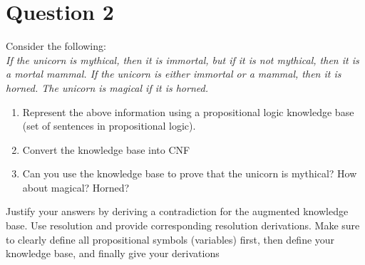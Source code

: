 \documentclass[13pt]{article}
\begin{document}
\newpage
\section*{Question 2} Consider the following: \\
\textit{If the unicorn is mythical, then it is immortal, but if it is not mythical, then it is a mortal
  mammal. If the unicorn is either immortal or a mammal, then it is horned. The unicorn is
  magical if it is horned.}
\begin{enumerate}[label=(\alph*)]
\item Represent the above information using a propositional logic knowledge base (set of sentences in
  propositional logic).
\item Convert the knowledge base into CNF
\item Can you use the knowledge base to prove that the unicorn is mythical? How about magical?
  Horned?
\end{enumerate} Justify your answers by deriving a contradiction for the augmented knowledge base. Use resolution
and provide corresponding resolution derivations. Make sure to clearly define all propositional symbols
(variables) first, then define your knowledge base, and finally give your derivations
\end{document}
